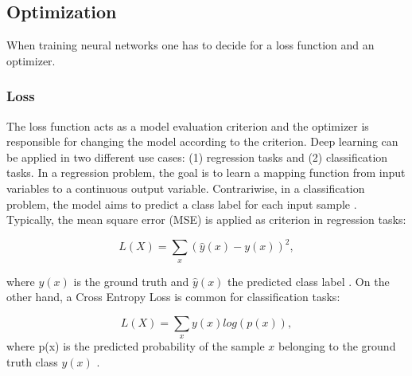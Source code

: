 \subsection{Optimization}
When training neural networks one has to decide for a loss function and an optimizer. 

\subsubsection{Loss}
The loss function acts as a model evaluation criterion and the optimizer is responsible for changing the model according to the criterion. Deep learning can be applied in two different use cases: (1) regression tasks and (2) classification tasks. In a regression problem, the goal is to learn a mapping function from input variables to a continuous output variable. Contrariwise, in a classification problem, the model aims to predict a class label for each input sample \cite{ShilohPerl2020}. Typically, the mean square error (MSE) is applied as criterion in regression tasks:

\begin{equation}
L(X) =  \sum_{x}(\hat{y}(x)-y(x))^2,
\end{equation}

where $y(x)$ is the ground truth and $\hat{y}(x)$ the predicted class label \cite{ShilohPerl2020}. On the other hand, a Cross Entropy Loss is common for classification tasks: 

\begin{equation}
L(X) = \sum_{x} y(x) log(p(x)),
\end{equation}
where p(x) is the predicted probability of the sample $x$ belonging to the ground truth class $y(x)$ \cite{ShilohPerl2020}.

